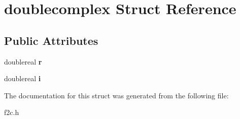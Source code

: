 \hypertarget{structdoublecomplex}{
\section{doublecomplex Struct Reference}
\label{structdoublecomplex}
}
\subsection*{Public Attributes}
\begin{DoxyCompactItemize}
\item 
\hypertarget{structdoublecomplex_aa21d9095ea8af6f0530961e14e25d060}{
doublereal {\bfseries r}}
\label{structdoublecomplex_aa21d9095ea8af6f0530961e14e25d060}

\item 
\hypertarget{structdoublecomplex_a29ac0f1fc7a96e2344ef1464a80e2877}{
doublereal {\bfseries i}}
\label{structdoublecomplex_a29ac0f1fc7a96e2344ef1464a80e2877}

\end{DoxyCompactItemize}


The documentation for this struct was generated from the following file:\begin{DoxyCompactItemize}
\item 
f2c.h\end{DoxyCompactItemize}
